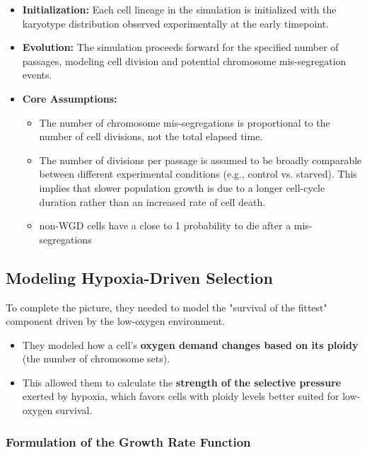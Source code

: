 \documentclass{article}
\begin{document}
\begin{itemize}
    \item \textbf{Initialization:} Each cell lineage in the simulation is initialized with the karyotype distribution observed experimentally at the early timepoint.

    \item \textbf{Evolution:} The simulation proceeds forward for the specified number of passages, modeling cell division and potential chromosome mis-segregation events.

    \item \textbf{Core Assumptions:}
    \begin{itemize}
        \item The number of chromosome mis-segregations is proportional to the number of cell divisions, not the total elapsed time.
        \item The number of divisions per passage is assumed to be broadly comparable between different experimental conditions (e.g., control vs. starved). This implies that slower population growth is due to a longer cell-cycle duration rather than an increased rate of cell death.
        \color{blue}
        \item non-WGD cells have a close to 1 probability to die after a mis-segregations
        \color{black}
    \end{itemize}
\end{itemize}

\subsection{Modeling Hypoxia-Driven Selection}
To complete the picture, they needed to model the "survival of the fittest" component driven by the low-oxygen environment.
\begin{itemize}
    \item They modeled how a cell's \textbf{oxygen demand changes based on its ploidy} (the number of chromosome sets).
    \item This allowed them to calculate the \textbf{strength of the selective pressure} exerted by hypoxia, which favors cells with ploidy levels better suited for low-oxygen survival.
\end{itemize}

\subsubsection*{Formulation of the Growth Rate Function}
\end{document}
